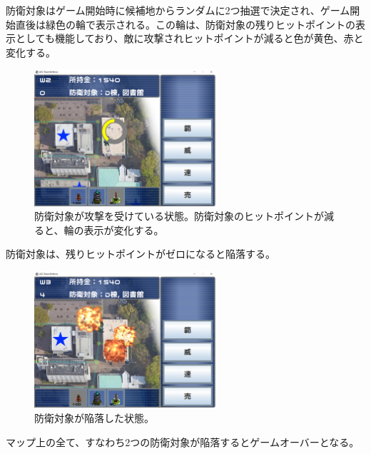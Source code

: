 \documentclass[11pt,a4j]{jarticle}
\begin{document}
防衛対象はゲーム開始時に候補地からランダムに2つ抽選で決定され、ゲーム開始直後は緑色の輪で表示される。この輪は、防衛対象の残りヒットポイントの表示としても機能しており、敵に攻撃されヒットポイントが減ると色が黄色、赤と変化する。

\begin{figure}[H]
    \begin{center}
        \leavevmode
        \includegraphics[width=0.6\textwidth]{beingattacked.png}
        \caption{防衛対象が攻撃を受けている状態。防衛対象のヒットポイントが減ると、輪の表示が変化する。}
        \label{fig:beingattacked}
    \end{center}
\end{figure}

防衛対象は、残りヒットポイントがゼロになると陥落する。

\begin{figure}[H]
    \begin{center}
        \leavevmode
        \includegraphics[width=0.6\textwidth]{destroyed.png}
        \caption{防衛対象が陥落した状態。}
        \label{fig:destroyed}
    \end{center}
\end{figure}

マップ上の全て、すなわち2つの防衛対象が陥落するとゲームオーバーとなる。
\end{document}
